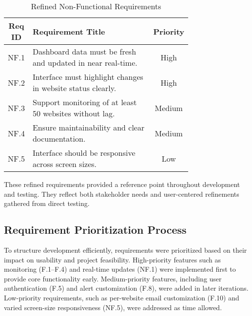 \begin{table}[H]
    \centering
    \caption{Refined Non-Functional Requirements}
    \label{tab:nonfunctional_reqs_refined}
    \begin{tabular}{|c|>{\raggedright\arraybackslash}p{0.75\linewidth}|c|}
        \hline
        \textbf{Req ID} & \textbf{Requirement Title} & \textbf{Priority} \\
        \hline
        NF.1 & Dashboard data must be fresh and updated in near real-time. & High \\
        \hline
        NF.2 & Interface must highlight changes in website status clearly. & High \\
        \hline
        NF.3 & Support monitoring of at least 50 websites without lag. & Medium \\
        \hline
        NF.4 & Ensure maintainability and clear documentation. & Medium \\
        \hline
        NF.5 & Interface should be responsive across screen sizes. & Low \\
        \hline
    \end{tabular}
\end{table}

These refined requirements provided a reference point throughout development and testing. They reflect both stakeholder needs and user-centered refinements gathered from direct testing.

\subsection{Requirement Prioritization Process}
\label{subsec:req_prio_process}

To structure development efficiently, requirements were prioritized based on their impact on usability and project feasibility. High-priority features such as monitoring (F.1–F.4) and real-time updates (NF.1) were implemented first to provide core functionality early. Medium-priority features, including user authentication (F.5) and alert customization (F.8), were added in later iterations. Low-priority requirements, such as per-website email customization (F.10) and varied screen-size responsiveness (NF.5), were addressed as time allowed.